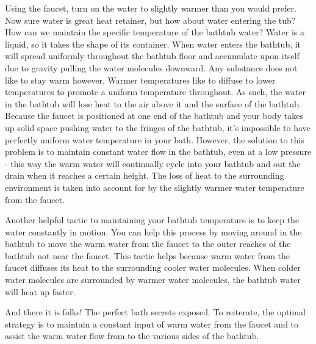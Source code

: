 \documentclass[10pt]{article}
\begin{document}
	Using the faucet, turn on the water to slightly warmer than you would prefer. Now sure water is great heat retainer, but how about water entering the tub? How can we maintain the specific temperature of the bathtub water? Water is a liquid, so it takes the shape of its container. When water enters the bathtub, it will spread uniformly throughout the bathtub floor and accumulate upon itself due to gravity pulling the water molecules downward. Any substance does not like to stay warm however. Warmer temperatures like to diffuse to lower temperatures to promote a uniform temperature throughout. As such, the water in the bathtub will lose heat to the air above it and the surface of the bathtub. Because the faucet is positioned at one end of the bathtub and your body takes up solid space pushing water to the fringes of the bathtub, it's impossible to have perfectly uniform water temperature in your bath. However, the solution to this problem is to maintain constant water flow in the bathtub, even at a low pressure - this way the warm water will continually cycle into your bathtub and out the drain when it reaches a certain height. The loss of heat to the surrounding environment is taken into account for by the slightly warmer water temperature from the faucet.
	
	Another helpful tactic to maintaining your bathtub temperature is to keep the water constantly in motion. You can help this process by moving around in the bathtub to move the warm water from the faucet to the outer reaches of the bathtub not near the faucet. This tactic helps because warm water from the faucet diffuses its heat to the surrounding cooler water molecules. When colder water molecules are surrounded by warmer water molecules, the bathtub water will heat up faster.
	
	And there it is folks! The perfect bath secrets exposed. To reiterate, the optimal strategy is to maintain a constant input of warm water from the faucet and to assist the warm water flow from to the various sides of the bathtub. 
	
\end{document}
